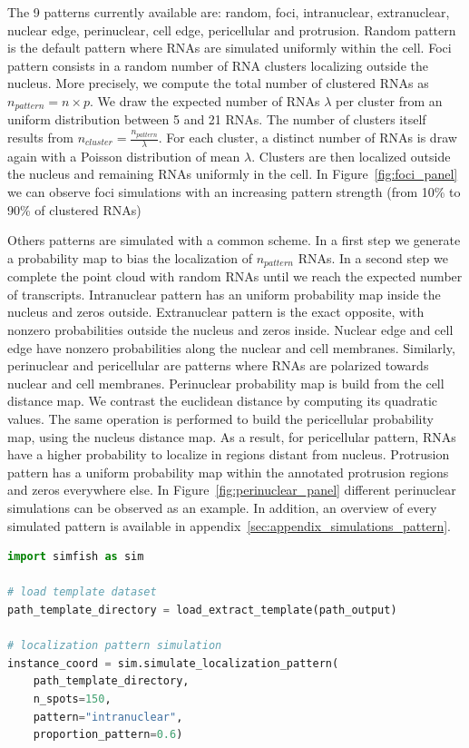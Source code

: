 The 9 patterns currently available are: random, foci, intranuclear, extranuclear, nuclear edge, perinuclear, cell edge, pericellular and protrusion.
Random pattern is the default pattern where \ac{RNA}s are simulated uniformly within the cell.
Foci pattern consists in a random number of \ac{RNA} clusters localizing outside the nucleus.
More precisely, we compute the total number of clustered \ac{RNA}s as $n_{pattern} = n \times p$.
We draw the expected number of \ac{RNA}s $\lambda$ per cluster from an uniform distribution between 5 and 21 \ac{RNA}s.
The number of clusters itself results from $n_{cluster}= \frac{n_{pattern}}{\lambda}$.
For each cluster, a distinct number of \ac{RNA}s is draw again with a Poisson distribution of mean $\lambda$.
Clusters are then localized outside the nucleus and remaining \ac{RNA}s uniformly in the cell.
In Figure~\ref{fig:foci_panel} we can observe foci simulations with an increasing pattern strength (from 10\% to 90\% of clustered \ac{RNA}s)

Others patterns are simulated with a common scheme.
In a first step we generate a probability map to bias the localization of $n_{pattern}$ \ac{RNA}s.
In a second step we complete the point cloud with random \ac{RNA}s until we reach the expected number of transcripts.
Intranuclear pattern has an uniform probability map inside the nucleus and zeros outside.
Extranuclear pattern is the exact opposite, with nonzero probabilities outside the nucleus and zeros inside.
Nuclear edge and cell edge have nonzero probabilities along the nuclear and cell membranes.
Similarly, perinuclear and pericellular are patterns where \ac{RNA}s are polarized towards nuclear and cell membranes.
Perinuclear probability map is build from the cell distance map.
We contrast the euclidean distance by computing its quadratic values.
The same operation is performed to build the pericellular probability map, using the nucleus distance map.
As a result, for pericellular pattern, \ac{RNA}s have a higher probability to localize in regions distant from nucleus.
Protrusion pattern has a uniform probability map within the annotated protrusion regions and zeros everywhere else.
In Figure~\ref{fig:perinuclear_panel} different perinuclear simulations can be observed as an example.
In addition, an overview of every simulated pattern is available in appendix~\ref{sec:appendix_simulations_pattern}.\\

\begin{minipage}{0.9\textwidth}
\begin{lstlisting}[language=Python]
import simfish as sim

# load template dataset
path_template_directory = load_extract_template(path_output)

# localization pattern simulation
instance_coord = sim.simulate_localization_pattern(
	path_template_directory,
	n_spots=150,
	pattern="intranuclear",
	proportion_pattern=0.6)
\end{lstlisting}
\end{minipage}

